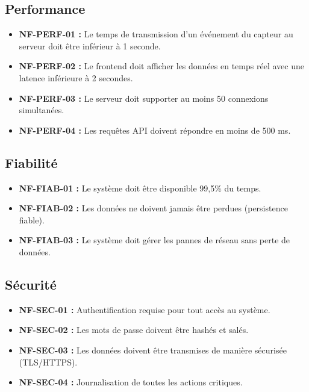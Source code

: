 \subsection{Performance}

\begin{itemize}
    \item \textbf{NF-PERF-01 :} Le temps de transmission d'un \'ev\'enement du capteur au serveur doit \^etre inf\'erieur \`a 1 seconde.
    \item \textbf{NF-PERF-02 :} Le frontend doit afficher les donn\'ees en temps r\'eel avec une latence inf\'erieure \`a 2 secondes.
    \item \textbf{NF-PERF-03 :} Le serveur doit supporter au moins 50 connexions simultan\'ees.
    \item \textbf{NF-PERF-04 :} Les requ\^etes API doivent r\'epondre en moins de 500 ms.
\end{itemize}

\subsection{Fiabilit\'e}

\begin{itemize}
    \item \textbf{NF-FIAB-01 :} Le syst\`eme doit \^etre disponible 99,5\% du temps.
    \item \textbf{NF-FIAB-02 :} Les donn\'ees ne doivent jamais \^etre perdues (persistence fiable).
    \item \textbf{NF-FIAB-03 :} Le syst\`eme doit g\'erer les pannes de r\'eseau sans perte de donn\'ees.
\end{itemize}

\subsection{S\'ecurit\'e}

\begin{itemize}
    \item \textbf{NF-SEC-01 :} Authentification requise pour tout acc\`es au syst\`eme.
    \item \textbf{NF-SEC-02 :} Les mots de passe doivent \^etre hash\'es et sal\'es.
    \item \textbf{NF-SEC-03 :} Les donn\'ees doivent \^etre transmises de mani\`ere s\'ecuris\'ee (TLS/HTTPS).
    \item \textbf{NF-SEC-04 :} Journalisation de toutes les actions critiques.
\end{itemize}

